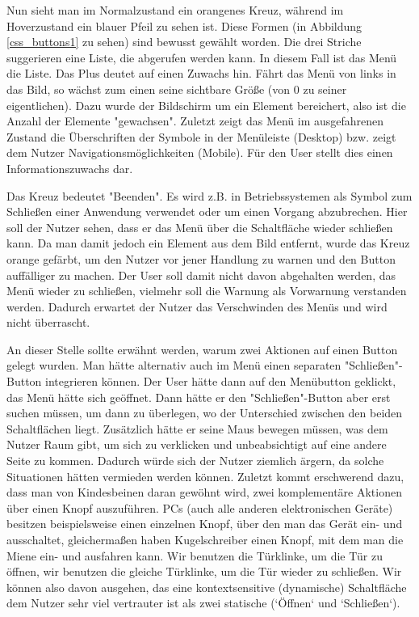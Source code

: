 Nun sieht man im Normalzustand ein orangenes Kreuz, während im Hoverzustand ein blauer Pfeil zu sehen ist. Diese Formen (in Abbildung \ref{css_buttons1} zu sehen) sind bewusst gewählt worden. Die drei Striche suggerieren eine Liste, die abgerufen werden kann. In diesem Fall ist das Menü die Liste. Das Plus deutet auf einen Zuwachs hin. Fährt das Menü von links in das Bild, so wächst zum einen seine sichtbare Größe (von 0 zu seiner eigentlichen). Dazu wurde der Bildschirm um ein Element bereichert, also ist die Anzahl der Elemente "gewachsen". Zuletzt zeigt das Menü im ausgefahrenen Zustand die Überschriften der Symbole in der Menüleiste (Desktop) bzw. zeigt dem Nutzer Navigationsmöglichkeiten (Mobile). Für den User stellt dies einen Informationszuwachs dar.

Das Kreuz bedeutet "Beenden". Es wird z.B. in Betriebssystemen als Symbol zum Schließen einer Anwendung verwendet oder um einen Vorgang abzubrechen. Hier soll der Nutzer sehen, dass er das Menü über die Schaltfläche wieder schließen kann. Da man damit jedoch ein Element aus dem Bild entfernt, wurde das Kreuz orange gefärbt, um den Nutzer vor jener Handlung zu warnen und den Button auffälliger zu machen. Der User soll damit nicht davon abgehalten werden, das Menü wieder zu schließen, vielmehr soll die Warnung als Vorwarnung verstanden werden. Dadurch erwartet der Nutzer das Verschwinden des Menüs und wird nicht überrascht.

An dieser Stelle sollte erwähnt werden, warum zwei Aktionen auf einen Button gelegt wurden. Man hätte alternativ auch im Menü einen separaten "Schließen"-Button integrieren können. Der User hätte dann auf den Menübutton geklickt, das Menü hätte sich geöffnet. Dann hätte er den "Schließen"-Button aber erst suchen müssen, um dann zu überlegen, wo der Unterschied zwischen den beiden Schaltflächen liegt. Zusätzlich hätte er seine Maus bewegen müssen, was dem Nutzer Raum gibt, um sich zu verklicken und unbeabsichtigt auf eine andere Seite zu kommen. Dadurch würde sich der Nutzer ziemlich ärgern, da solche Situationen hätten vermieden werden können. Zuletzt kommt erschwerend dazu, dass man von Kindesbeinen daran gewöhnt wird, zwei komplementäre Aktionen über einen Knopf auszuführen. PCs (auch alle anderen elektronischen Geräte) besitzen beispielsweise einen einzelnen Knopf, über den man das Gerät ein- und ausschaltet, gleichermaßen haben Kugelschreiber einen Knopf, mit dem man die Miene ein- und ausfahren kann. Wir benutzen die Türklinke, um die Tür zu öffnen, wir benutzen die gleiche Türklinke, um die Tür wieder zu schließen. Wir können also davon ausgehen, das  eine kontextsensitive (dynamische) Schaltfläche dem Nutzer sehr viel vertrauter ist als zwei statische (`Öffnen` und `Schließen`).

